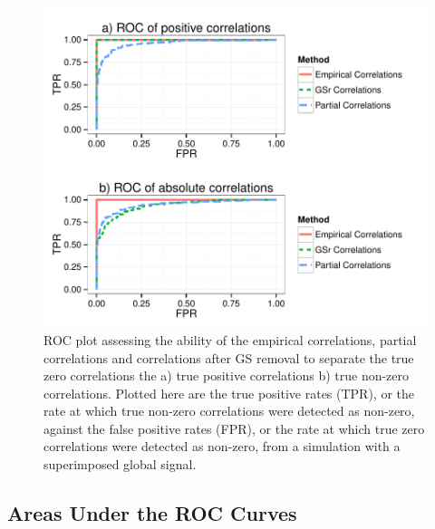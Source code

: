 \documentclass[a4paper]{article}\usepackage[]{graphicx}\usepackage[]{color}
\makeatletter
\def\maxwidth{ %
  \ifdim\Gin@nat@width>\linewidth
    \linewidth
  \else
    \Gin@nat@width
  \fi
}
\newenvironment{knitrout}{}{} %
\makeatother
\begin{document}
\begin{knitrout}
\color{fgcolor}\begin{figure}[]


{\centering \includegraphics[width=\maxwidth]{GSFigs/GSROCGS} 

}

\caption[ROC plot assessing the ability of the empirical correlations, partial correlations and correlations after GS removal to separate the true zero correlations the a) true positive correlations b) true non-zero correlations]{ROC plot assessing the ability of the empirical correlations, partial correlations and correlations after GS removal to separate the true zero correlations the a) true positive correlations b) true non-zero correlations. Plotted here are the true positive rates (TPR), or the rate at which true non-zero correlations were detected as non-zero, against the false positive rates (FPR), or the rate at which true zero correlations were detected as non-zero, from a simulation with a superimposed global signal.\label{fig:ROCGS}}
\end{figure}


\end{knitrout}









\clearpage
\subsection{Areas Under the ROC Curves}
\end{document}
